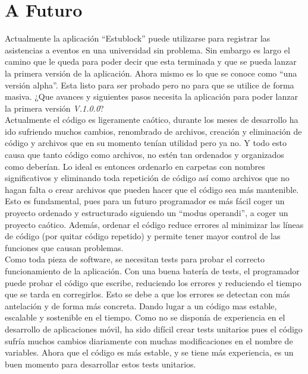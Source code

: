 \chapter{A Futuro}
\label{cap:Futuro}

Actualmente la aplicación ``Estublock'' puede utilizarse para registrar las asistencias a eventos en una universidad sin problema. Sin embargo es largo el camino que le queda para poder decir que esta terminada y que se pueda lanzar la primera versión de la aplicación. Ahora mismo es lo que se conoce como ``una versión alpha''. Esta listo para ser probado pero no para que se utilice de forma masiva. ¿Que avances y siguientes pasos necesita la aplicación para poder lanzar la primera versión \emph{V.1.0.0}? \\

Actualmente el código es ligeramente caótico, durante los meses de desarrollo ha ido sufriendo muchos cambios, renombrado de archivos, creación y eliminación de código y archivos que en su momento tenían utilidad pero ya no. Y todo esto causa que tanto código como archivos, no estén tan ordenados y organizados como deberían. Lo ideal es entonces ordenarlo en carpetas con nombres significativos y eliminando toda repetición de código así como archivos que no hagan falta o crear archivos que pueden hacer que el código sea más mantenible. Esto es fundamental, pues para un futuro programador es más fácil coger un proyecto ordenado y estructurado siguiendo un ``modus operandi'', a coger un proyecto caótico. Además, ordenar el código reduce errores al minimizar las líneas de código (por quitar código repetido) y permite tener mayor control de las funciones que causan problemas. \\
 
Como toda pieza de software, se necesitan tests para probar el correcto funcionamiento de la aplicación. Con una buena batería de tests, el programador puede probar el código que escribe, reduciendo los errores y reduciendo el tiempo que se tarda en corregirlos. Esto se debe a que los errores se detectan con más antelación y de forma más concreta. Dando lugar a un código mas estable, escalable y sostenible en el tiempo. Como no se disponía de experiencia en el desarrollo de aplicaciones móvil, ha sido difícil crear tests unitarios pues el código sufría muchos cambios diariamente con muchas modificaciones en el nombre de variables. Ahora que el código es más estable, y se tiene más experiencia, es un buen momento para desarrollar estos tests unitarios. \\

